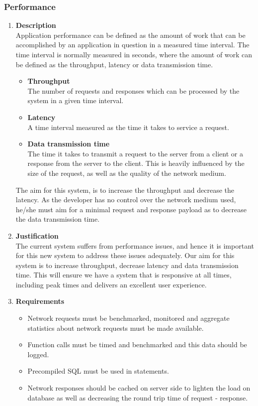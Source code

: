\documentclass[a4paper,10pt]{article}
\begin{document}
\subsubsection{Performance}
\begin{enumerate}
\item \textbf{Description} \\
Application performance can be defined as the amount of work that can be accomplished by an application in question in a measured time interval. The time interval is normally measured in seconds, where the amount of work can be defined as the throughput, latency or data transmission time.
	\begin{itemize}
		\item \textbf{Throughput} \\
		The number of requests and responses which can be processed by the system in a given time interval.
		\item \textbf{Latency} \\
		A time interval measured as the time it takes to service a request. 
		\item \textbf{Data transmission time} \\
		The time it takes to transmit a request to the server from a client or a response from the server to the client. This is heavily influenced by the size of the request, as well as the quality of the network medium.
	\end{itemize}
	
	The aim for this system, is to increase the throughput and decrease the latency. As the developer has no control over the network medium used, he/she must aim for a minimal request and response payload as to decrease the data transmission time.
\item \textbf{Justification} \\
The current system suffers from performance issues, and hence it is important for this new system to address these issues adequately. Our aim for this system is to increase throughput, decrease latency and data transmission time. This will ensure we have a system that is responsive at all times, including peak times and delivers an excellent user experience.
\item \textbf{Requirements}
	\begin{itemize}
		\item Network requests must be benchmarked, monitored and aggregate statistics about network requests must be made available.
		\item Function calls must be timed and benchmarked and this data should be logged.
		\item Precompiled SQL must be used in statements.
		\item Network responses should be cached on server side to lighten the load on database as well as decreasing the round trip time of request - response.
		\end{itemize}
\end{enumerate}
\end{document}
